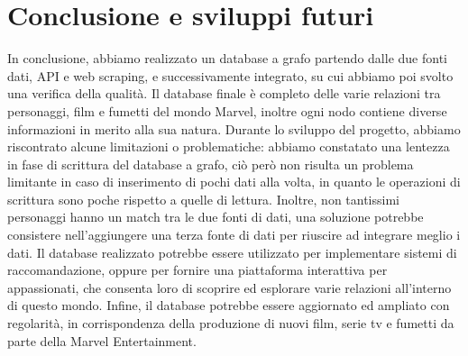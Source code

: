 \documentclass[
12pt, %
a4paper, %
oneside, %
headinclude,footinclude, %
BCOR5mm, %
]{scrartcl}
\begin{document}
\section{Conclusione e sviluppi futuri}
In conclusione, abbiamo realizzato un database a grafo partendo dalle due fonti dati, API e web scraping, e successivamente integrato, su cui abbiamo poi svolto una verifica della qualità. Il database finale è completo delle varie relazioni tra personaggi, film e fumetti del mondo Marvel, inoltre ogni nodo contiene diverse informazioni in merito alla sua natura.
Durante lo sviluppo del progetto, abbiamo riscontrato alcune limitazioni o problematiche: abbiamo constatato una lentezza in fase di scrittura del database a grafo, ciò però non risulta un problema limitante in caso di inserimento di pochi dati alla volta, in quanto le operazioni di scrittura sono poche rispetto a quelle di lettura. Inoltre, non tantissimi personaggi hanno un match tra le due fonti di dati, una soluzione potrebbe consistere nell'aggiungere una terza fonte di dati per riuscire ad integrare meglio i dati.
Il database realizzato potrebbe essere utilizzato per implementare sistemi di raccomandazione, oppure per fornire una piattaforma interattiva per appassionati, che consenta loro di scoprire ed esplorare varie relazioni all'interno di questo mondo.
Infine, il database potrebbe essere aggiornato ed ampliato con regolarità, in corrispondenza della produzione di nuovi film, serie tv e fumetti da parte della Marvel Entertainment.


\renewcommand{\refname}{\spacedlowsmallcaps{References}} %




\end{document}
